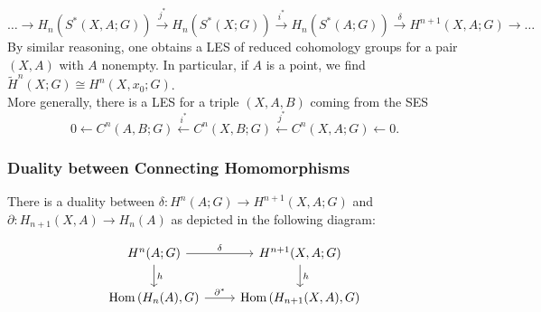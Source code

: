 \documentclass[reqno]{amsart}
\theoremstyle{definition}
\theoremstyle{remark}
\DeclareMathOperator{\Hom}{Hom}
\begin{document}
     \[
     \ldots \to 
     H_n \left( S^{*}(X,A;G) \right) 
     \stackrel{j^{*}}{\to} 
     H_n \left( S^{*}(X;G) \right) 
     \stackrel{i^{*}}{\to} 
     H_n (S^{*}(A;G)) 
     \stackrel{\delta}{\to} 
     H^{n+1}(X,A;G) \to \ldots
     \] 
     By similar reasoning, one obtains a
     LES of reduced cohomology groups for a pair
     $(X,A)$ with $A$ nonempty.
     In particular, if $A$ is a point, we find
     $\tilde{H}^{n}(X;G) \cong
     H^{n}(X,x_0;G)$.\\
     \linebreak
     More generally, there is a LES for a triple
     $\left( X,A,B \right) $ coming from the
     SES
     \[
     0 \leftarrow C^{n}(A,B;G)
     \stackrel{i^{*}}{\leftarrow}
     C^{n}(X,B;G) \stackrel{j^{*}}{\leftarrow}
     C^{n}(X,A;G) \leftarrow 0.
     \] 


     \subsubsection{Duality between Connecting
     Homomorphisms}

     There is a duality between
     $\delta \colon
     H^{n}(A;G) \to H^{n+1}(X,A;G)$ and
     $\partial \colon
     H_{n+1}(X,A) \to H_n(A)$ as depicted in the
     following diagram:

     \begin{equation*}
     \begin{tikzcd}
         H^{n}(A;G) \ar[r, "\delta"] \ar[d,"h"] & 
         H^{n+1}(X,A;G) \ar[d, "h"] \\
         \Hom\left( H_n(A),G \right) 
         \ar[r, "\partial^{*}"] &
         \Hom \left( H_{n+1}(X,A),G \right) 
     \end{tikzcd}
     \end{equation*}
     
\end{document}
